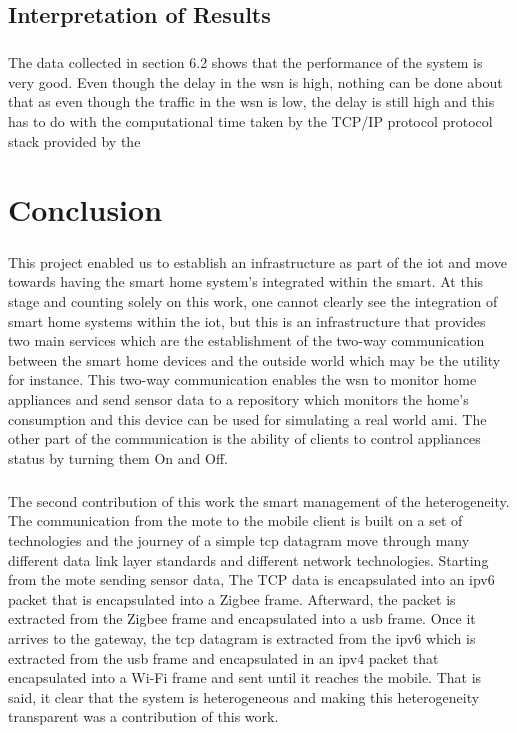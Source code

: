 \documentclass[oneside,12pt,a4paper,final]{book}
\begin{document}
\section{Interpretation of Results}
\paragraph{}
The data collected in section 6.2 shows that the performance of the system is very good. Even though the delay in the \gls{wsn} is high, 
 nothing can be done about that as even though the traffic in the \gls{wsn} is low, the delay is still high and this has to do with the computational time taken by the TCP/IP protocol protocol stack provided by the 
\chapter{Conclusion}
\paragraph{}
This project enabled us to establish an infrastructure as part of the \gls{iot} and move towards having the smart home system's integrated within the smart. At this stage and counting solely on this work, one cannot clearly see the integration of smart home systems within the \gls{iot}, but this is an infrastructure that provides two main services which are the establishment of the two-way communication between the smart home devices and the outside world which may be the utility for instance. This two-way communication enables the \gls{wsn} to monitor home appliances and send sensor data to a repository which monitors the home's consumption and this device can be used for simulating a real world \gls{ami}. The other part of the communication is the ability of clients to control appliances status by turning them On and Off.
\paragraph{}
The second contribution of this work the smart management of the heterogeneity. The communication from the mote to the mobile client is built on a set of technologies and the journey of a simple \gls{tcp} datagram move through many different data link layer standards and different network technologies. Starting from the mote sending sensor data, The TCP data is encapsulated into an \gls{ipv6} packet that is encapsulated into a Zigbee frame. Afterward, the packet is extracted from the Zigbee frame and encapsulated into a \gls{usb} frame. Once it arrives to the gateway, the \gls{tcp} datagram is extracted from the \gls{ipv6} which is extracted from the \gls{usb} frame and encapsulated in an \gls{ipv4} packet that encapsulated into a Wi-Fi frame and sent until it reaches the mobile. That is said, it clear that the system is heterogeneous and making this heterogeneity transparent was a contribution of this work.
\end{document}
